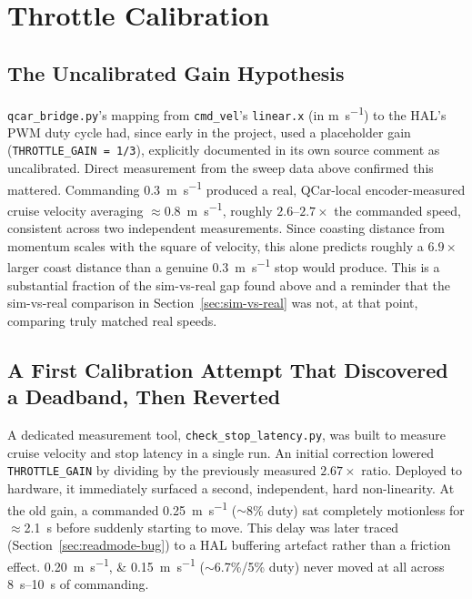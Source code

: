 \section{Throttle Calibration}
\label{sec:throttle-calibration}

\subsection{The Uncalibrated Gain Hypothesis}
\label{sec:throttle-gain-hypothesis}

\texttt{qcar\_bridge.py}'s mapping from \texttt{cmd\_vel}'s
\texttt{linear.x} (in \si{\meter\per\second}) to the HAL's PWM duty
cycle had, since early in the project, used a placeholder gain
(\texttt{THROTTLE\_GAIN = 1/3}), explicitly documented in its own
source comment as uncalibrated. Direct measurement from the sweep
data above confirmed this mattered. Commanding
\SI{0.3}{\meter\per\second} produced a real, QCar-local
encoder-measured cruise velocity averaging
$\approx$\SI{0.8}{\meter\per\second}, roughly $2.6$--$2.7\times$ the
commanded speed, consistent across two independent measurements.
Since coasting distance from momentum scales with the square of
velocity, this alone predicts roughly a $6.9\times$ larger coast
distance than a genuine \SI{0.3}{\meter\per\second} stop would
produce. This is a substantial fraction of the sim-vs-real gap found
above and a reminder that the sim-vs-real comparison in
Section~\ref{sec:sim-vs-real} was not, at that point, comparing truly
matched real speeds.

\subsection{A First Calibration Attempt That Discovered a Deadband, Then Reverted}
\label{sec:deadband-discovery}

A dedicated measurement tool, \texttt{check\_stop\_latency.py}, was
built to measure cruise velocity and stop latency in a single run. An
initial correction lowered \texttt{THROTTLE\_GAIN} by dividing by
the previously measured $2.67\times$ ratio. Deployed to hardware, it
immediately surfaced a second, independent, hard non-linearity. At
the old gain, a commanded \SI{0.25}{\meter\per\second} ($\sim$8\%
duty) sat completely motionless for $\approx$\SI{2.1}{\second}
before suddenly starting to move. This delay was later traced
(Section~\ref{sec:readmode-bug}) to a HAL buffering artefact rather
than a friction effect. \SIlist{0.20;0.15}{\meter\per\second}
($\sim$6.7\%/5\% duty) never moved at all across
\SIrange{8}{10}{\second} of commanding.

